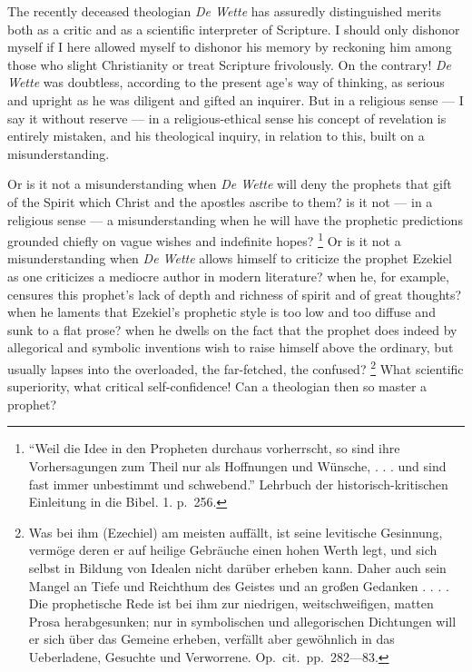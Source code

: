 \documentclass[12pt,a4paper]{book}
\begin{document}
The recently deceased theologian \textit{De Wette} has assuredly distinguished
merits both as a critic and as a scientific interpreter of Scripture. I should only
dishonor myself if I here allowed myself to dishonor his memory by reckoning him
among those who slight Christianity or treat Scripture frivolously. On the contrary!
\textit{De Wette} was doubtless, according to the present age's way of thinking, as
serious and upright as he was diligent and gifted an inquirer. But in a religious
sense --- I say it without reserve --- in a religious-ethical sense his concept of
revelation is entirely mistaken, and his theological inquiry, in relation to this,
built on a misunderstanding.

Or is it not a misunderstanding when \textit{De Wette} will deny the prophets that
gift of the Spirit which Christ and the apostles ascribe to them? is it not --- in a
religious sense --- a misunderstanding when he will have the prophetic predictions
grounded chiefly on vague wishes and indefinite hopes?%
\footnote{``Weil die Idee in den Propheten durchaus vorherrscht, so sind ihre
Vorhersagungen zum Theil nur als Hoffnungen und Wünsche, . . . und sind fast immer
unbestimmt und schwebend.'' Lehrbuch der historisch-kritischen Einleitung in die
Bibel. 1. p.~256.}
Or is it not a misunderstanding when \textit{De Wette} allows himself to criticize
the prophet Ezekiel as one criticizes a mediocre author in modern literature? when
he, for
example, censures this prophet's lack of depth and richness of spirit and of great
thoughts? when he laments that Ezekiel's prophetic style is too low and too diffuse
and sunk to a flat prose? when he dwells on the fact that the prophet does indeed by
allegorical and symbolic inventions wish to raise himself above the ordinary, but
usually lapses into the overloaded, the far-fetched, the confused?%
\footnote{Was bei ihm (Ezechiel) am meisten auffällt, ist seine levitische
Gesinnung, vermöge deren er auf heilige Gebräuche einen hohen Werth legt, und sich
selbst in Bildung von Idealen nicht darüber erheben kann. Daher auch sein Mangel an
Tiefe und Reichthum des Geistes und an großen Gedanken . . . . Die prophetische Rede
ist bei ihm zur niedrigen, weitschweifigen, matten Prosa herabgesunken; nur in
symbolischen und allegorischen Dichtungen will er sich über das Gemeine erheben,
verfällt aber gewöhnlich in das Ueberladene, Gesuchte und Verworrene. Op.\ cit.\
pp.~282---83.}
What scientific superiority, what critical self-confidence! Can a theologian then so
master a prophet?
\end{document}
